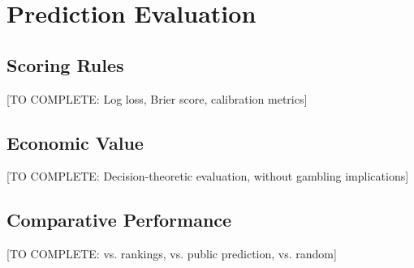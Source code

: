 \section{Prediction Evaluation}

\subsection{Scoring Rules}

[TO COMPLETE: Log loss, Brier score, calibration metrics]

\subsection{Economic Value}

[TO COMPLETE: Decision-theoretic evaluation, without gambling implications]

\subsection{Comparative Performance}

[TO COMPLETE: vs. rankings, vs. public prediction, vs. random]